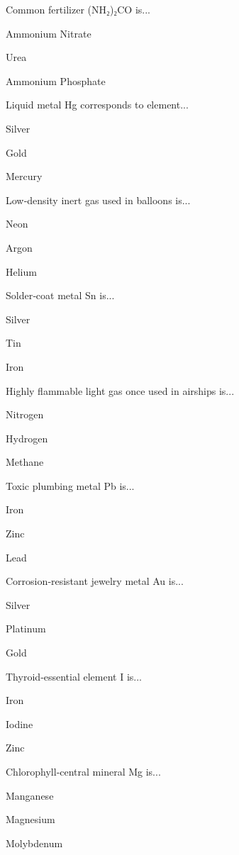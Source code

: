 \begin{enhancedmcq}{Common fertilizer (NH₂)₂CO is...}
\item Ammonium Nitrate
\item Urea
\item Ammonium Phosphate

\end{enhancedmcq}
\begin{enhancedmcq}{Liquid metal Hg corresponds to element...}
\item Silver
\item Gold
\item Mercury

\end{enhancedmcq}
\begin{enhancedmcq}{Low‑density inert gas used in balloons is...}
\item Neon
\item Argon
\item Helium

\end{enhancedmcq}
\begin{enhancedmcq}{Solder‑coat metal Sn is...}
\item Silver
\item Tin
\item Iron

\end{enhancedmcq}
\begin{enhancedmcq}{Highly flammable light gas once used in airships is...}
\item Nitrogen
\item Hydrogen
\item Methane

\end{enhancedmcq}
\begin{enhancedmcq}{Toxic plumbing metal Pb is...}
\item Iron
\item Zinc
\item Lead

\end{enhancedmcq}
\begin{enhancedmcq}{Corrosion‑resistant jewelry metal Au is...}
\item Silver
\item Platinum
\item Gold

\end{enhancedmcq}
\begin{enhancedmcq}{Thyroid‑essential element I is...}
\item Iron
\item Iodine
\item Zinc

\end{enhancedmcq}
\begin{enhancedmcq}{Chlorophyll‑central mineral Mg is...}
\item Manganese
\item Magnesium
\item Molybdenum
\end{enhancedmcq}
